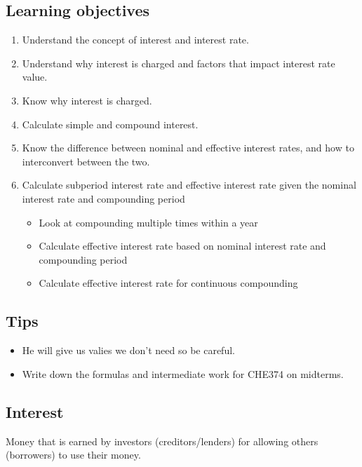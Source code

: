 \subsection{Learning objectives}
\begin{definition}
    \begin{enumerate}
        \item Understand the concept of interest and interest rate. 
        \item Understand why interest is charged and factors that impact interest rate value.
        \item Know why interest is charged. 
        \item Calculate simple and compound interest.
        \item Know the difference between nominal and effective interest rates, and how to interconvert between the two.
        \item Calculate subperiod interest rate and effective interest rate given the nominal interest rate and compounding period
        \begin{itemize}
            \item Look at compounding multiple times within a year
            \item Calculate effective interest rate based on nominal interest rate and compounding period
            \item Calculate effective interest rate for continuous compounding
        \end{itemize}
    \end{enumerate}
\end{definition}

\subsection{Tips}
\begin{intuition}
    \begin{itemize}
        \item He will give us valies we don't need so be careful. 
        \item Write down the formulas and intermediate work for CHE374 on midterms.
    \end{itemize}
\end{intuition}

\subsection{Interest}
\begin{definition}
    Money that is earned by investors (creditors/lenders) for allowing others (borrowers) to use their money.
\end{definition}

